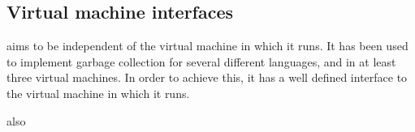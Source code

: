 \subsection{Virtual machine interfaces}

\mmtk aims to be independent of the virtual machine in which it runs.  It has
been used to implement garbage collection for several different languages,
and in at least three \java virtual machines.  In order to achieve this, it has
a well defined interface to the virtual machine in which it runs.  

\mmtk also 

